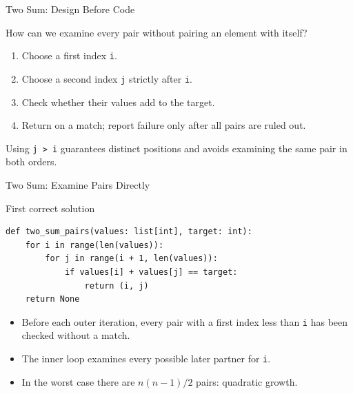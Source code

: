 \documentclass[aspectratio=169,10pt]{beamer}
\begin{document}
\begin{frame}{Two Sum: Design Before Code}
\small
\begin{activity}
How can we examine every pair without pairing an element with itself?
\end{activity}
\begin{enumerate}
 \item Choose a first index \texttt{i}.
 \item Choose a second index \texttt{j} strictly after \texttt{i}.
 \item Check whether their values add to the target.
 \item Return on a match; report failure only after all pairs are ruled out.
\end{enumerate}
\begin{keyidea}Using \texttt{j > i} guarantees distinct positions and avoids examining the same pair in both orders.\end{keyidea}
\end{frame}

\begin{frame}[fragile]{Two Sum: Examine Pairs Directly}
\small
\begin{block}{First correct solution}
\footnotesize
\begin{verbatim}
def two_sum_pairs(values: list[int], target: int):
    for i in range(len(values)):
        for j in range(i + 1, len(values)):
            if values[i] + values[j] == target:
                return (i, j)
    return None
\end{verbatim}
\end{block}
\begin{itemize}
 \item Before each outer iteration, every pair with a first index less than \texttt{i} has been checked without a match.
 \item The inner loop examines every possible later partner for \texttt{i}.
 \item In the worst case there are $n(n-1)/2$ pairs: quadratic growth.
\end{itemize}
\end{frame}
\end{document}
